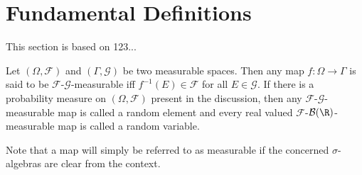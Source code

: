 \section{Fundamental Definitions}
This section is based on 123...

\begin{defn}
Let $(\Omega,\mathcal{F})$ and $(\Gamma,\mathcal{G})$ be two measurable spaces. Then any map $f:\Omega\to\Gamma$ is said to be $\mathcal{F}$-$\mathcal{G}$-measurable iff $f^{-1}(E)\in\mathcal{F}$ for all $E\in\mathcal{G}$. If there is a probability measure on $(\Omega,\mathcal{F})$ present in the discussion, then any $\mathcal{F}$-$\mathcal{G}$-measurable map is called a random element and every real valued $\mathcal{F}$-$\mathcal{B}(\R)$-measurable map is called a random variable.
\end{defn}
Note that a map will simply be referred to as measurable if the concerned $\sigma$-algebras are clear from the context.




